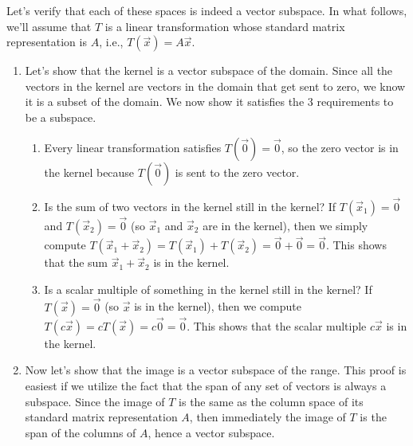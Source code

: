 \begin{example}\label{verification of key subspaces}
Let's verify that each of these spaces is indeed a vector subspace. In what follows, we'll assume that $T$ is a linear transformation whose standard matrix representation is $A$, i.e., $T(\vec x)=A\vec x$. 
\begin{enumerate}
	\item Let's show that the kernel is a vector subspace of the domain. Since all the vectors in the kernel are vectors in the domain that get sent to zero, we know it is a subset of the domain.  We now show it satisfies the 3 requirements to be a subspace. 
\begin{enumerate}
	\item Every linear transformation satisfies $T(\vec 0)=\vec 0$, so the zero vector is in the kernel because $T(\vec 0)$ is sent to the zero vector.  
	\item Is the sum of two vectors in the kernel still in the kernel? If $T(\vec x_1)=\vec 0$ and $T(\vec x_2)=\vec 0$ (so $\vec x_1$ and $\vec x_2$ are in the kernel), then we simply compute $T(\vec x_1+\vec x_2)=T(\vec x_1)+T(\vec x_2)=\vec 0+\vec 0=\vec 0$. This shows that the sum $\vec x_1+\vec x_2$ is in the kernel. 
	\item Is a scalar multiple of something in the kernel still in the kernel? If $T(\vec x)=\vec 0$ (so $\vec x$ is in the kernel), then we compute $T(c\vec x)=cT(\vec x)=c\vec 0=\vec 0$. This shows that the scalar multiple $c\vec x$ is in the kernel. 
\end{enumerate}

	\item Now let's show that the image is a vector subspace of the range. This proof is easiest if we utilize the fact that the span of any set of vectors is always a subspace.  Since the image of $T$ is the same as the column space of its standard matrix representation $A$, then immediately the image of $T$ is the span of the columns of $A$, hence a vector subspace.
	

\end{enumerate}
\end{example}
